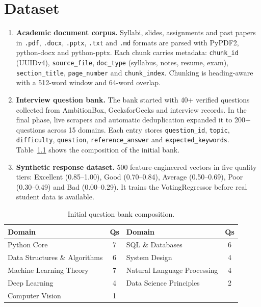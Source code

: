 \documentclass[11pt,a4paper]{report}
\begin{document}
\chapter{Dataset}

\begin{enumerate}
  \item \textbf{Academic document corpus.} Syllabi, slides, assignments and past papers in \texttt{.pdf}, \texttt{.docx}, \texttt{.pptx}, \texttt{.txt} and \texttt{.md} formats are parsed with PyPDF2, python-docx and python-pptx. Each chunk carries metadata: \texttt{chunk\_id} (UUIDv4), \texttt{source\_file}, \texttt{doc\_type} (syllabus, notes, resume, exam), \texttt{section\_title}, \texttt{page\_number} and \texttt{chunk\_index}. Chunking is heading-aware with a 512-word window and 64-word overlap.

  \item \textbf{Interview question bank.} The bank started with 40+ verified questions collected from AmbitionBox, GeeksforGeeks and interview records. In the final phase, live scrapers and automatic deduplication expanded it to {200+} questions across {15} domains. Each entry stores \texttt{question\_id}, \texttt{topic}, \texttt{difficulty}, \texttt{question}, \texttt{reference\_answer} and \texttt{expected\_keywords}. Table~\ref{tab:qbank} shows the composition of the initial bank.

  \item \textbf{Synthetic response dataset.} 500 feature-engineered vectors in five quality tiers: Excellent (0.85--1.00), Good (0.70--0.84), Average (0.50--0.69), Poor (0.30--0.49) and Bad (0.00--0.29). It trains the VotingRegressor before real student data is available.

\end{enumerate}

\begin{table}[H]
\centering
\begin{tabular}{lclc}
\toprule
\textbf{Domain} & \textbf{Qs} & \textbf{Domain} & \textbf{Qs}\\
\midrule
Python Core & 7 & SQL \& Databases & 6\\
Data Structures \& Algorithms & 6 & System Design & 4\\
Machine Learning Theory & 7 & Natural Language Processing & 4\\
Deep Learning & 4 & Data Science Principles & 2\\
Computer Vision & 1 & & \\
\bottomrule
\end{tabular}
\caption{Initial question bank composition.}
\label{tab:qbank}
\end{table}
\end{document}
